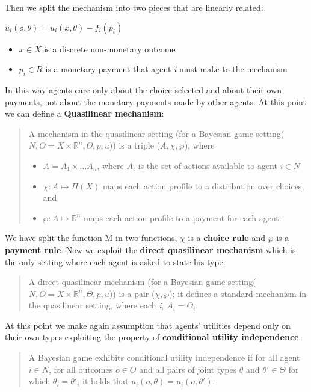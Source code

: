 \documentclass{article}
\begin{document}
{Then we split the mechanism into two pieces that are linearly related:
\begin{center}
    $u_i(o,\theta) = u_i(x,\theta) - f_i(p_i)$
    \begin{itemize}
        \item $x \in X$ is a discrete non-monetary outcome
        \item $p_i \in R$ is a monetary payment that agent \textit{i} must make to the mechanism\newpage
    \end{itemize}
\end{center}
In this way agents care only about the choice selected and about their own payments, not about the monetary payments made by other agents. At this point we can define a \textbf{Quasilinear mechanism}:
\begin{quote}
    A mechanism in the quasilinear setting (for a Bayesian game setting($N,O = X \times \mathbb{R}^n,\Theta,p,u$)) is a triple ($A,\chi,\wp$), where
    \begin{itemize}
        \item $A = A_1 \times \dots A_n$, where $A_i$ is the set of actions available to agent $i \in N$
        \item $\chi : A \mapsto \Pi(X)$ maps each action profile to a distribution over choices, and
        \item $\wp : A \mapsto \mathbb{R}^n$ maps each action profile to a payment for each agent.
    \end{itemize}
\end{quote}
We have split the function M in two functions, $\chi$ is a \textbf{choice rule} and $\wp$ is a \textbf{payment rule}. Now we exploit the \textbf{direct quasilinear mechanism} which is the only setting where each agent is asked to state his type.
\begin{quote}
    A direct quasilinear mechanism (for a Bayesian game setting($N,O = X \times \mathbb{R}^n,\Theta,p,u$)) is a pair ($\chi,\wp$); it defines a standard mechanism in the quasilinear setting, where each \textit{i}, $A_i = \Theta_i$.
\end{quote}
At this point we make again assumption that agents' utilities depend only on their own types exploiting the property of \textbf{conditional utility independence}:
\begin{quote}
    A Bayesian game exhibits conditional utility independence if for all agent $i \in N$, for all outcomes $o \in O$ and all pairs of joint types $\theta$ and $\theta' \in \Theta$ for which $\theta_i = \theta'_i$ it holds that $u_i(o,\theta) = u_i(o,\theta')$. 

\end{quote}}
\end{document}
